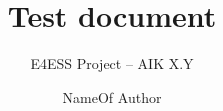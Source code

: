 \documentclass[]{e4esslayout}
\title{Test document}
\subtitle{E4ESS Project -- AIK X.Y}
\author{NameOf Author}
\begin{document}
\raggedbottom


\end{document}
